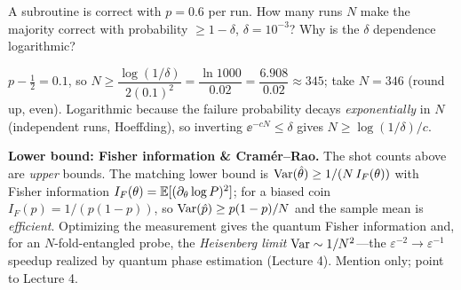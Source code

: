 \documentclass[11pt]{article}
\begin{document}
\begin{inclass}\label{ic:maj}
A subroutine is correct with $p=0.6$ per run. How many runs $N$ make the majority
correct with probability $\ge1-\delta$, $\delta=10^{-3}$? Why is the $\delta$
dependence logarithmic?
\end{inclass}
\begin{answer}
$p-\tfrac12=0.1$, so $N\ge\dfrac{\log(1/\delta)}{2(0.1)^2}=\dfrac{\ln 1000}{0.02}
=\dfrac{6.908}{0.02}\approx345$; take $N=346$ (round up, even). Logarithmic because the
failure probability decays \emph{exponentially} in $N$ (independent runs, Hoeffding),
so inverting $\ee^{-cN}\le\delta$ gives $N\ge\log(1/\delta)/c$.
\end{answer}

\begin{advanced}
\textbf{Lower bound: Fisher information \& Cram\'er--Rao.} The shot counts above are
\emph{upper} bounds. The matching lower bound is $\operatorname{Var}(\hat\theta)\ge1/(N\,I_F(\theta))$
with Fisher information $I_F(\theta)=\mathbb{E}[(\partial_\theta\log P)^2]$; for a biased coin
$I_F(p)=1/(p(1-p))$, so $\operatorname{Var}(\hat p)\ge p(1-p)/N$ and the sample mean is
\emph{efficient}. Optimizing the measurement gives the quantum Fisher information and,
for an $N$-fold-entangled probe, the \emph{Heisenberg limit} $\operatorname{Var}\sim1/N^2$---the
$\varepsilon^{-2}\to\varepsilon^{-1}$ speedup realized by quantum phase estimation
(Lecture 4). Mention only; point to Lecture 4.
\end{advanced}
\end{document}
